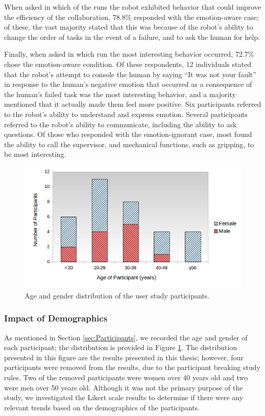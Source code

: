 \documentclass[12pt]{report}
\begin{document}
When asked in which of the runs the robot exhibited behavior that could improve
the efficiency of the collaboration, 78.8\% responded with the emotion-aware
case; of these, the vast majority stated that this was because of the robot's
ability to change the order of tasks in the event of a failure, and to ask the
human for help.

Finally, when asked in which run the most interesting behavior occurred,
72.7\% chose the emotion-aware condition. Of these respondents, 12
individuals stated that the robot's attempt to console the human by saying ``It
was not your fault'' in response to the human's negative emotion that occurred
as a consequence of the human's failed task was the most interesting behavior,
and a majority mentioned that it actually made them feel more positive. Six
participants referred to the robot's ability to understand and express emotion.
Several participants referred to the robot's ability to communicate, including
the ability to ask questions. Of those who responded with the emotion-ignorant
case, most found the ability to call the supervisor, and mechanical functions,
such as gripping, to be most interesting.

\begin{figure}
\centering
\includegraphics[width=1\textwidth]{figure/age-gender-distribution.png}
\caption{Age and gender distribution of the user study participants.}
\label{fig:age-gender-distribution}
\end{figure}

\subsubsection{Impact of Demographics} 
As mentioned in Section \ref{sec:Participants}, we recorded the age and gender
of each participant; the distribution is provided in Figure
\ref{fig:age-gender-distribution}. The distribution presented in this figure are
the results presented in this thesis; however, four participants were removed
from the results, due to the participant breaking study rules. Two of the
removed participants were women over 40 years old and two were men over 50 years
old. Although it was not the primary purpose of the study, we investigated the
Likert scale results to determine if there were any relevant trends based on the
demographics of the participants.
\end{document}
